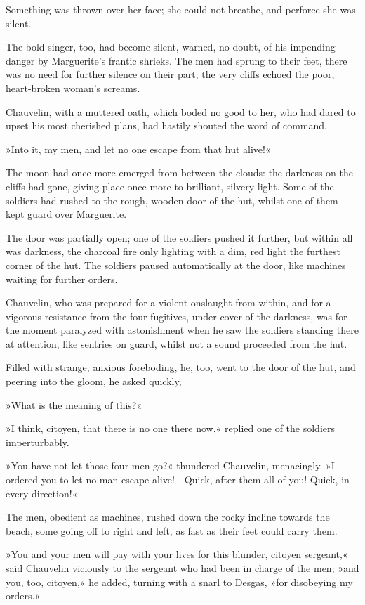Something was thrown over her face; she could not breathe, and perforce she was silent.

The bold singer, too, had become silent, warned, no doubt, of his impending danger by Marguerite's frantic shrieks. The men had sprung to their feet, there was no need for further silence on their part; the very cliffs echoed the poor, heart-broken woman's screams.

Chauvelin, with a muttered oath, which boded no good to her, who had dared to upset his most cherished plans, had hastily shouted the word of command,\longdash


»Into it, my men, and let no one escape from that hut alive!«

The moon had once more emerged from between the clouds: the darkness on the cliffs had gone, giving place once more to brilliant, silvery light. Some of the soldiers had rushed to the rough, wooden door of the hut, whilst one of them kept guard over Marguerite.

The door was partially open; one of the soldiers pushed it further, but within all was darkness, the charcoal fire only lighting with a dim, red light the furthest corner of the hut. The soldiers paused automatically at the door, like machines waiting for further orders.

Chauvelin, who was prepared for a violent onslaught from within, and for a vigorous resistance from the four fugitives, under cover of the darkness, was for the moment paralyzed with astonishment when he saw the soldiers standing there at attention, like sentries on guard, whilst not a sound proceeded from the hut.

Filled with strange, anxious foreboding, he, too, went to the door of the hut, and peering into the gloom, he asked quickly,\longdash


»What is the meaning of this?«

»I think, citoyen, that there is no one there now,« replied one of the soldiers imperturbably.

»You have not let those four men go?« thundered Chauvelin, menacingly. »I ordered you to let no man escape alive!—Quick, after them all of you! Quick, in every direction!«

The men, obedient as machines, rushed down the rocky incline towards the beach, some going off to right and left, as fast as their feet could carry them.

»You and your men will pay with your lives for this blunder, citoyen sergeant,« said Chauvelin viciously to the sergeant who had been in charge of the men; »and you, too, citoyen,« he added, turning with a snarl to Desgas, »for disobeying my orders.«

